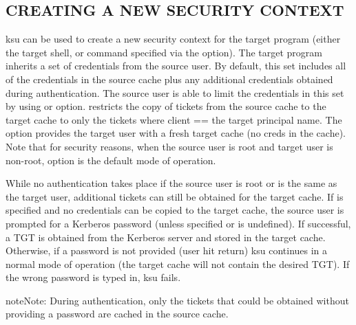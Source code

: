 \documentclass[letterpaper,10pt,english]{sphinxmanual}
\begin{document}
\subsection{CREATING A NEW SECURITY CONTEXT}
\label{\detokenize{user/user_commands/ksu:creating-a-new-security-context}}
ksu can be used to create a new security context for the target
program (either the target shell, or command specified via the 
option).  The target program inherits a set of credentials from the
source user.  By default, this set includes all of the credentials in
the source cache plus any additional credentials obtained during
authentication.  The source user is able to limit the credentials in
this set by using  or  option.   restricts the copy
of tickets from the source cache to the target cache to only the
tickets where client == the target principal name.  The  option
provides the target user with a fresh target cache (no creds in the
cache).  Note that for security reasons, when the source user is root
and target user is non-root,  option is the default mode of
operation.

While no authentication takes place if the source user is root or is
the same as the target user, additional tickets can still be obtained
for the target cache.  If  is specified and no credentials can
be copied to the target cache, the source user is prompted for a
Kerberos password (unless  specified or 
is undefined).  If successful, a TGT is obtained from the Kerberos
server and stored in the target cache.  Otherwise, if a password is
not provided (user hit return) ksu continues in a normal mode of
operation (the target cache will not contain the desired TGT).  If the
wrong password is typed in, ksu fails.

\begin{sphinxadmonition}{note}{Note:}
During authentication, only the tickets that could be
obtained without providing a password are cached in the
source cache.
\end{sphinxadmonition}
\end{document}
